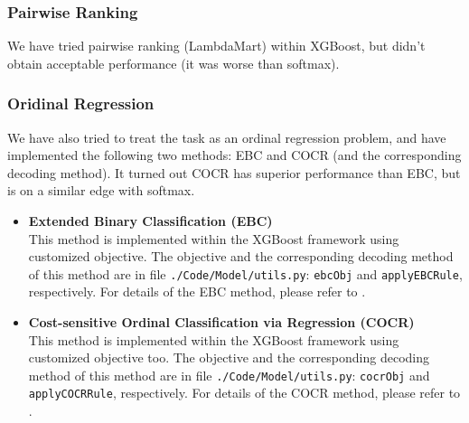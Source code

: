\documentclass[12pt]{article}
\begin{document}
\subsubsection{Pairwise Ranking}
We have tried pairwise ranking (LambdaMart) within XGBoost, but didn't obtain acceptable performance (it was worse than softmax).

\subsubsection{Oridinal Regression}
We have also tried to treat the task as an ordinal regression problem, and have implemented the following two methods: EBC and COCR (and the corresponding decoding method). It turned out COCR has superior performance than EBC, but is on a similar edge with softmax.
\begin{itemize}
\item \textbf{Extended Binary Classification (EBC)}\\
This method is implemented within the XGBoost framework using customized objective. The objective and the corresponding decoding method of this method are in file \texttt{./Code/Model/utils.py}: \texttt{ebcObj} and \texttt{applyEBCRule}, respectively. For details of the EBC method, please refer to \cite{ebc}.
\item \textbf{Cost-sensitive Ordinal Classification via Regression (COCR)}\\
This method is implemented within the XGBoost framework using customized objective too. The objective and the corresponding decoding method of this method are in file \texttt{./Code/Model/utils.py}: \texttt{cocrObj} and \texttt{applyCOCRRule}, respectively. For details of the COCR method, please refer to \cite{cocr}.
\end{itemize}
\end{document}
